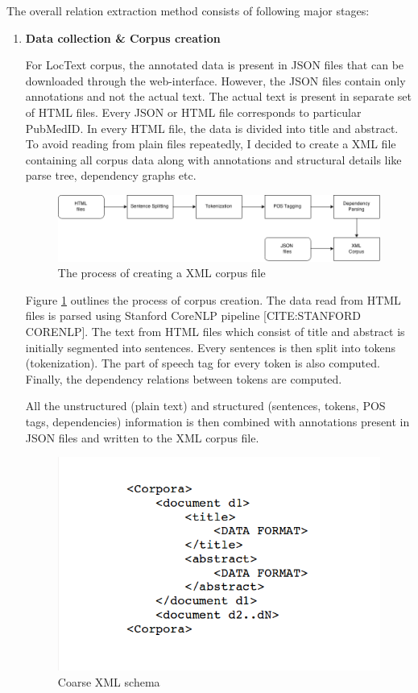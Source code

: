 The overall relation extraction method consists of following major stages:

\begin{enumerate}

\item \textbf{Data collection \& Corpus creation}

For LocText corpus, the annotated data is present in JSON files that can be downloaded through the web-interface. However, the JSON files contain only annotations and not the actual text. The actual text is present in separate set of HTML files. Every JSON or HTML file corresponds to particular PubMedID. In every HTML file, the data is divided into title and abstract. To avoid reading from plain files repeatedly, I decided to create a XML file containing all corpus data along with annotations and structural details like parse tree, dependency graphs etc.

\begin{figure}
\centering
\includegraphics[scale=0.4]{figures/Corpus_Creation.png}
\caption{The process of creating a XML corpus file}\label{fig:corpusCreation}
\end{figure}

Figure \ref{fig:corpusCreation} outlines the process  of corpus creation. The data read from HTML files is parsed using Stanford CoreNLP pipeline [CITE:STANFORD CORENLP]. The text from HTML files which consist of title and abstract is initially segmented into sentences. Every sentences is then split into tokens (tokenization). The part of speech tag for every token is also computed. Finally, the dependency relations between tokens are computed.

All the unstructured (plain text) and structured (sentences, tokens, POS tags, dependencies) information is then combined with annotations present in JSON files and written to the XML corpus file.

\begin{figure}
\centering
\includegraphics[scale=0.4]{figures/XMLSchema1.png}
\caption{Coarse XML schema}\label{fig:XMLSchema1}
\end{figure}


\end{enumerate}
